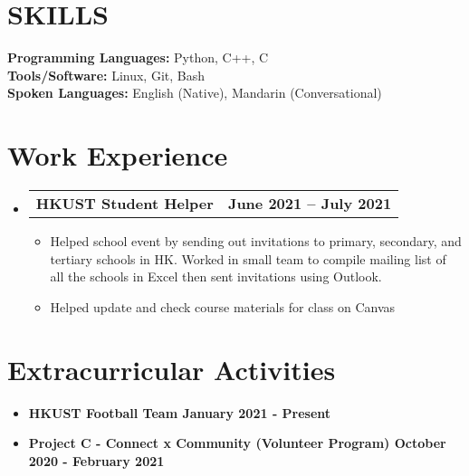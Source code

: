 \documentclass[letterpaper,11pt]{article}
\makeatletter
\newcommand{\resumeItem}[1]{
  \item\small{
    {#1 \vspace{-2pt}}
  }
}
\newcommand{\resumeSubheading}[4]{
  \vspace{-2pt}\item
    \begin{tabular*}{1.0\textwidth}[t]{l@{\extracolsep{\fill}}r}
      \textbf{\large#1} & \textbf{\small #2} \\
    \end{tabular*}\vspace{-7pt}
}
\newcommand{\resumeSubHeadingListStart}{\begin{itemize}[leftmargin=0.0in, label={}]}
\newcommand{\resumeSubHeadingListEnd}{\end{itemize}}
\newcommand{\resumeItemListStart}{\begin{itemize}}
\newcommand{\resumeItemListEnd}{\end{itemize}\vspace{-5pt}}
\makeatother
\begin{document}
\section{SKILLS}
 \begin{itemize}[leftmargin=0.15in, label={}]
    \small{\item{
     \textbf{\normalsize{Programming Languages:}}{ \normalsize{Python, C++, C}} \\
     \vspace{1pt}
     \textbf{\normalsize{Tools/Software:}}{\normalsize{ Linux, Git, Bash}} \\
     \vspace{1pt}
     \textbf{\normalsize{Spoken Languages:}}{\normalsize{ English (Native), Mandarin (Conversational)}} \\
    }}
 \end{itemize}
\vspace{1pt}

\section{Work Experience}
  \resumeSubHeadingListStart
    \vspace{3pt}
    \resumeSubheading
      {HKUST Student Helper}{June 2021 -- July 2021} 
      {}{}
      \resumeItemListStart
        \resumeItem{\normalsize{Helped school event by sending out invitations to primary, secondary, and tertiary schools in HK. Worked in small team to compile mailing list of all the schools in Excel then sent invitations using Outlook.}}
        \resumeItem{\normalsize{Helped update and check course materials for class on Canvas}}
      \resumeItemListEnd  
  \resumeSubHeadingListEnd
\vspace{1pt}

\section{Extracurricular Activities}
    \begin{itemize}[itemsep=-2pt, parsep=5pt] 
        \item \textbf {HKUST Football Team \hfill January 2021 - Present}
        \item \textbf {Project C - Connect x Community (Volunteer Program) \hfill October 2020 - February 2021}
    \end{itemize}
\end{document}
